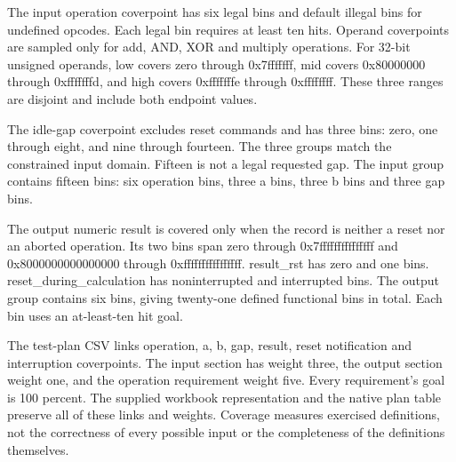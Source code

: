 \documentclass[11pt,a4paper]{article}
\begin{document}
The input operation coverpoint has six legal bins and default illegal bins for undefined opcodes. Each legal bin requires at least ten hits. Operand coverpoints are sampled only for add, AND, XOR and multiply operations. For 32-bit unsigned operands, low covers zero through 0x7fffffff, mid covers 0x80000000 through 0xfffffffd, and high covers 0xfffffffe through 0xffffffff. These three ranges are disjoint and include both endpoint values.


The idle-gap coverpoint excludes reset commands and has three bins:\allowbreak{} zero, one through eight, and nine through fourteen. The three groups match the constrained input domain. Fifteen is not a legal requested gap. The input group contains fifteen bins:\allowbreak{} six operation bins, three a bins, three b bins and three gap bins.


The output numeric result is covered only when the record is neither a reset nor an aborted operation. Its two bins span zero through 0x7fffffffffffffff and 0x8000000000000000 through 0xffffffffffffffff. result\_\allowbreak{}rst has zero and one bins. reset\_\allowbreak{}during\_\allowbreak{}calculation has noninterrupted and interrupted bins. The output group contains six bins, giving twenty-one defined functional bins in total. Each bin uses an at-least-ten hit goal.


The test-plan CSV links operation, a, b, gap, result, reset notification and interruption coverpoints. The input section has weight three, the output section weight one, and the operation requirement weight five. Every requirement's goal is 100 percent. The supplied workbook representation and the native plan table preserve all of these links and weights. Coverage measures exercised definitions, not the correctness of every possible input or the completeness of the definitions themselves.
\end{document}
